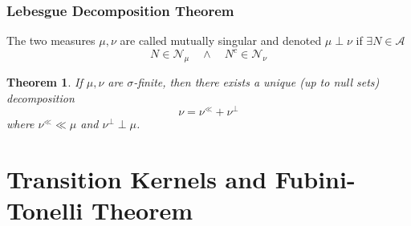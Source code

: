 \documentclass[11pt, a4paper, openany]{book}
\newtheorem{thm}{Theorem}\newtheorem{lem}{Lemma}\newtheorem{crl}{Corollary}
\theoremstyle{definition}
\begin{document}
\subsection{Lebesgue Decomposition Theorem}
    The two measures $\mu,\nu$ are called mutually singular and denoted $\mu\perp\nu$ if $\exists N\in\mathscr{A}$
    \[N\in\mathscr{N}_\mu\quad\wedge\quad N^c\in\mathscr{N}_\nu\]
    \begin{thm}
        If $\mu,\nu$ are $\sigma$-finite, then there exists a unique (up to null sets) decomposition \[\nu=\nu^\ll+\nu^\perp\]where $\nu^\ll\ll\mu$ and $\nu^\perp\perp\mu$.
    \end{thm}
\chapter{Transition Kernels and Fubini-Tonelli Theorem}
\end{document}
